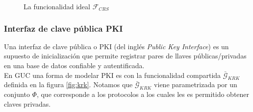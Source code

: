 \begin{figure}
\caption{La funcionalidad ideal $\mathcal{F}_{CRS}$}
\label{fig:crs}
\end{figure}


\subsubsection{Interfaz de clave pública PKI}
Una interfaz de clave pública o PKI (del inglés \textit{Public Key Interface}) es un supuesto de inicialización
que permite registrar pares de llaves públicas/privadas en una base de datos confiable y autentificada.\\
En GUC una forma de modelar PKI es con la funcionalidad compartida $\bar{\mathcal{G}}_{KRK}$ definida en la figura
\ref{fig:krk}. Notamos que $\bar{\mathcal{G}}_{KRK}$ viene parametrizada por un conjunto $\Phi$, que corresponde
a los protocolos a los cuales les es permitido obtener claves privadas. 

